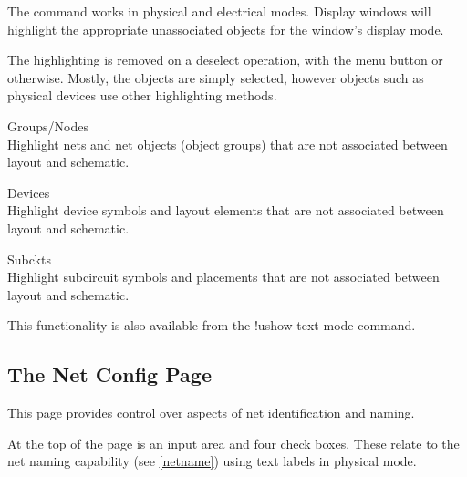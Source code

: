 The command works in physical and electrical modes.  Display windows
will highlight the appropriate unassociated objects for the window's
display mode.

The highlighting is removed on a deselect operation, with the menu
button or otherwise.  Mostly, the objects are simply selected, however
objects such as physical devices use other highlighting methods.

\begin{description}
\item{\cb Groups/Nodes}\\
Highlight nets and net objects (object groups) that are not associated
between layout and schematic.

\item{\cb Devices}\\
Highlight device symbols and layout elements that are not associated
between layout and schematic.

\item{\cb Subckts}\\
Highlight subcircuit symbols and placements that are not associated
between layout and schematic.
\end{description}

This functionality is also available from the {\cb !ushow} text-mode
command.

\subsection{The {\cb Net Config} Page}

This page provides control over aspects of net identification and
naming.

At the top of the page is an input area and four check boxes.  These
relate to the net naming capability (see \ref{netname}) using text
labels in physical mode.

